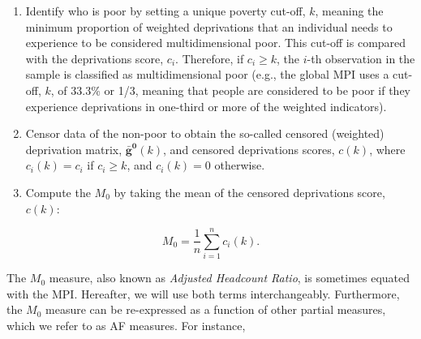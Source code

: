 \begin{enumerate}
\item
  Identify who is poor by setting a unique poverty cut-off, \(k\), meaning the minimum proportion of weighted deprivations that an individual needs to experience to be considered multidimensional poor. This cut-off is compared with the deprivations score, \(c_i\). Therefore, if \(c_{i} \geq k\), the \(i\)-th observation in the sample is classified as multidimensional poor (e.g., the global MPI uses a cut-off, \(k\), of 33.3\% or 1/3, meaning that people are considered to be poor if they experience deprivations in one-third or more of the weighted indicators).
\item
  Censor data of the non-poor to obtain the so-called censored (weighted) deprivation matrix, \(\mathbf{\bar{g}^0}(k)\), and censored deprivations scores, \(c(k)\), where \(c_{i} (k) = c_{i}\) if \(c_{i} \geq k\), and \(c_{i} (k) = 0\) otherwise.
\item
  Compute the \(M_0\) by taking the mean of the censored deprivations score, \(c(k)\):
\end{enumerate}

\begin{equation}
M_0 = \frac{1}{n} \sum_{i=1}^n c_i(k).
\label{eq:M0}
\end{equation}

The \(M_0\) measure, also known as \emph{Adjusted Headcount Ratio}, is sometimes equated with the MPI. Hereafter, we will use both terms interchangeably. Furthermore, the \(M_0\) measure can be re-expressed as a function of other partial measures, which we refer to as AF measures. For instance,

